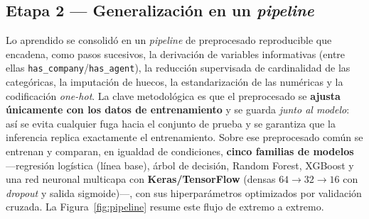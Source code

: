 \documentclass[10pt,twocolumn,a4paper]{article}
\newcommand{\var}[1]{\texttt{#1}}           %
\begin{document}
\subsection{Etapa 2 --- Generalización en un \emph{pipeline}}

Lo aprendido se consolidó en un \emph{pipeline} de preprocesado reproducible que
encadena, como pasos sucesivos, la derivación de variables informativas (entre ellas
\var{has\_company}/\var{has\_agent}), la reducción supervisada de cardinalidad de las
categóricas, la imputación de huecos, la estandarización de las numéricas y la
codificación \emph{one-hot}. La clave metodológica es que el preprocesado se
\textbf{ajusta únicamente con los datos de entrenamiento} y se guarda \emph{junto al
modelo}: así se evita cualquier fuga hacia el conjunto de prueba y se garantiza que la
inferencia replica exactamente el entrenamiento. Sobre ese preprocesado común se
entrenan y comparan, en igualdad de condiciones, \textbf{cinco familias de modelos}
---regresión logística (línea base), árbol de decisión, Random Forest, XGBoost y una
red neuronal multicapa con \textbf{Keras/TensorFlow} (densas $64\!\to\!32\!\to\!16$ con
\emph{dropout} y salida sigmoide)---, con sus hiperparámetros optimizados por validación
cruzada. La Figura~\ref{fig:pipeline} resume este flujo de extremo a extremo.
\end{document}
